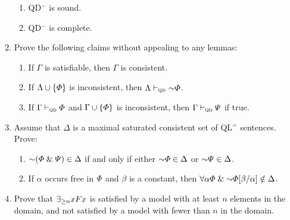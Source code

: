 \documentclass[12pt]{article}
\begin{document}
\begin{enumerate}
    \begin{enumerate}
      \item QD$^-$ is sound.
      \item QD$^-$ is complete.
    \end{enumerate}

  \item Prove the following claims without appealing to any lemmas:
    \begin{enumerate}
      \item If $\Gamma$ is satisfiable, then $\Gamma$ is consistent.
      \item If $\Lambda\cup\lbrace\varPhi\rbrace$ is inconsistent, then $\Lambda\proves_{\textsc{qd}}\enot\metaA$.   
      \item If $\Gamma \vdash_{\textsc{qd}} \varPhi$ and $\Gamma \cup \lbrace\varPhi\rbrace$ is inconsistent, then $\Gamma \vdash_{\textsc{qd}} \varPsi$ if true.
    \end{enumerate}


  \item Assume that $\Delta$ is a maximal saturated consistent set of QL$^=$ sentences.
  Prove:
    \begin{enumerate}
      \item $\enot (\metaA \eand \metaB) \in \Delta$ if and only if either $\enot\metaA\in \Delta$ or $\enot\metaB\in \Delta$.
      \item If $\alpha$ occurs free in $\varPhi$ and $\beta$ is a constant, then $\qt{\forall}{\alpha}\metaA \eand \enot\metaA\unisub{\beta}{\alpha} \notin \Delta$.
    \end{enumerate}
    

  \item Prove that $\exists_{\geq n} xFx$ is satisfied by a model with at least $n$ elements in the domain, and not satisfied by a model with fewer than $n$ in the domain.

\end{enumerate}
\end{document}
